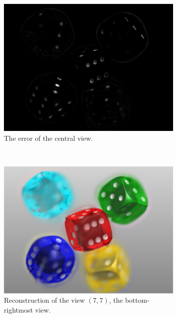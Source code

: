 \documentclass[11pt,a4paper,titlepage]{article}
\begin{document}
\begin{figure}[h]
\begin{subfigure}[t]{0.4\textwidth}
		\includegraphics[width=\textwidth]{results/dice_orthographic_rec_fov10_blurry_3Layers/central_view_error.png}
		\caption{The error of the central view.}
	\end{subfigure}%
	\\
	\begin{subfigure}[t]{0.4\textwidth}
		\includegraphics[width=\textwidth]{results/dice_orthographic_rec_fov10_blurry_3Layers/custom_view_reconstruction.png}
		\caption{Reconstruction of the view $\left( 7, 7 \right)$, the bottom-rightmost view.}
	\end{subfigure}%
	~
	\begin{subfigure}[t]{0.4\textwidth}

\end{subfigure}
\end{figure}
\end{document}
